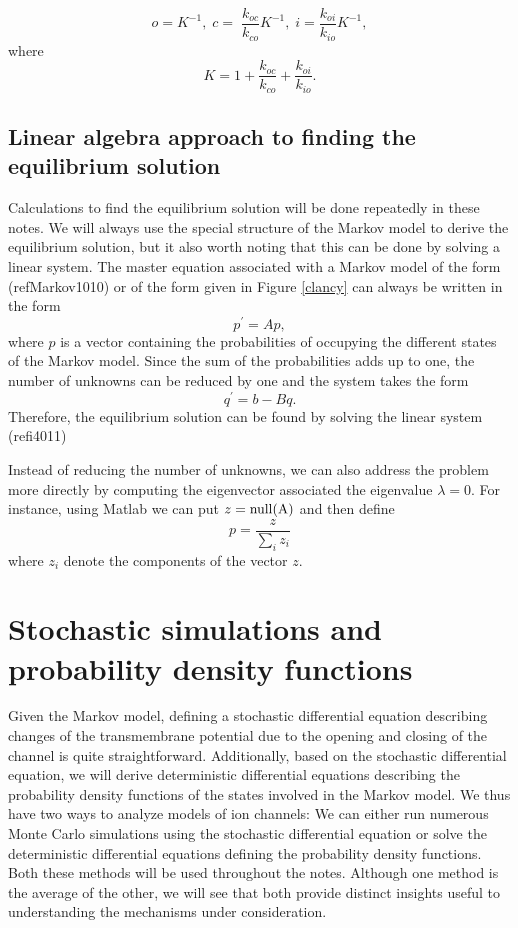 \[
o=K^{-1},\;c=\;\frac{k_{oc}}{k_{co}}K^{-1},\;i=\frac{k_{oi}}{k_{io}}K^{-1},
\]
where
\[
K=1+\frac{k_{oc}}{k_{co}}+\frac{k_{oi}}{k_{io}}.
\]

\subsection[Linear algebra]{Linear algebra approach to finding the equilibrium solution}

Calculations to find the equilibrium solution will be done repeatedly in these notes. We
will always use the special structure of the Markov model to derive the
equilibrium solution, but it also worth noting that this can be done by
solving a linear system. The master equation associated with a Markov model of the
form  (ref{Markov1010}) or of the form given in
Figure \ref{clancy} can always be written in the form
\[
p^{\prime}=Ap,
\]
where $p$ is a vector containing the probabilities of occupying the different
states of the Markov model. Since the sum of the probabilities adds up to one,
the number of unknowns can be reduced by one and the system takes the form
\[
q^{\prime}=b-Bq.
\]
Therefore, the equilibrium solution can be found by solving the linear system
(ref{i4011})

Instead of reducing the number of unknowns, we can also address the problem more directly by computing the eigenvector
associated the eigenvalue $\lambda = 0$. For instance, using Matlab  we can put $z=\rm{null}(A)$ and then define
\[p=\frac{z}{\sum_i z_i}\]
 where
$z_i$ denote the components of the vector $z$.


\section[Stochastic simulations and PDFs]{Stochastic simulations and probability density functions}

Given the Markov model, defining a stochastic differential equation describing changes of the transmembrane potential due to the opening and closing of the channel is quite straightforward. Additionally, based on the stochastic differential equation, we will derive deterministic differential equations describing the probability density functions of the states involved in the Markov model. We thus have two ways to analyze models of ion channels: We can either run numerous Monte Carlo simulations using the stochastic differential equation or solve the deterministic differential equations defining the probability density functions. Both these methods will be used throughout the notes. Although one method is the average of the other, we will see that both provide distinct insights useful to understanding the mechanisms under consideration.


